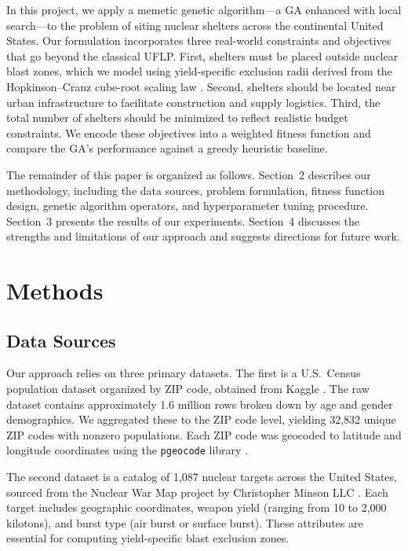 \documentclass[12pt]{article}
\begin{document}
In this project, we apply a memetic genetic algorithm---a GA enhanced with local search---to the problem of siting nuclear shelters across the continental United States. Our formulation incorporates three real-world constraints and objectives that go beyond the classical UFLP. First, shelters must be placed outside nuclear blast zones, which we model using yield-specific exclusion radii derived from the Hopkinson--Cranz cube-root scaling law \cite{glasstone1977}. Second, shelters should be located near urban infrastructure to facilitate construction and supply logistics. Third, the total number of shelters should be minimized to reflect realistic budget constraints. We encode these objectives into a weighted fitness function and compare the GA's performance against a greedy heuristic baseline.

The remainder of this paper is organized as follows. Section~2 describes our methodology, including the data sources, problem formulation, fitness function design, genetic algorithm operators, and hyperparameter tuning procedure. Section~3 presents the results of our experiments. Section~4 discusses the strengths and limitations of our approach and suggests directions for future work.


\section{Methods}

\subsection{Data Sources}

Our approach relies on three primary datasets. The first is a U.S.\ Census population dataset organized by ZIP code, obtained from Kaggle \cite{kaggle_census}. The raw dataset contains approximately 1.6 million rows broken down by age and gender demographics. We aggregated these to the ZIP code level, yielding 32,832 unique ZIP codes with nonzero populations. Each ZIP code was geocoded to latitude and longitude coordinates using the \texttt{pgeocode} library \cite{pgeocode}.

The second dataset is a catalog of 1,087 nuclear targets across the United States, sourced from the Nuclear War Map project by Christopher Minson LLC \cite{nuclearwarmap}. Each target includes geographic coordinates, weapon yield (ranging from 10 to 2,000 kilotons), and burst type (air burst or surface burst). These attributes are essential for computing yield-specific blast exclusion zones.
\end{document}

